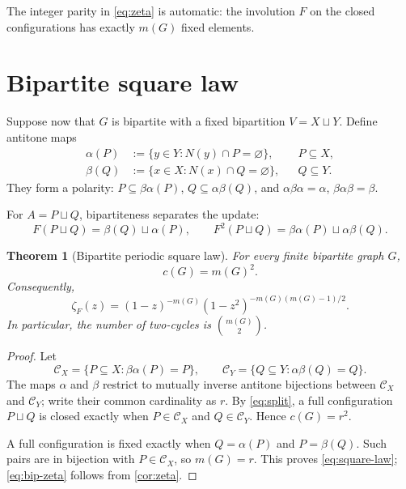 \documentclass[11pt,a4paper]{amsart}
\newtheorem{theorem}{Theorem}[section]
\theoremstyle{definition}
\theoremstyle{remark}
\begin{document}
The integer parity in \eqref{eq:zeta} is automatic: the involution $F$ on
the closed configurations has exactly $m(G)$ fixed elements.

\section{Bipartite square law}

Suppose now that $G$ is bipartite with a fixed bipartition
$V=X\sqcup Y$.  Define antitone maps
\begin{align}
 \alpha(P)&:=\{y\in Y:N(y)\cap P=\varnothing\},&&P\subseteq X,
 \label{eq:alpha}\\
 \beta(Q)&:=\{x\in X:N(x)\cap Q=\varnothing\},&&Q\subseteq Y.
 \label{eq:beta}
\end{align}
They form a polarity: $P\subseteq\beta\alpha(P)$,
$Q\subseteq\alpha\beta(Q)$, and
$\alpha\beta\alpha=\alpha$, $\beta\alpha\beta=\beta$.

For $A=P\sqcup Q$, bipartiteness separates the update:
\begin{equation}\label{eq:split}
 F(P\sqcup Q)=\beta(Q)\sqcup\alpha(P),
 \qquad
 F^2(P\sqcup Q)=\beta\alpha(P)\sqcup\alpha\beta(Q).
\end{equation}

\begin{theorem}[Bipartite periodic square law]\label{thm:square}
For every finite bipartite graph $G$,
\begin{equation}\label{eq:square-law}
 \boxed{c(G)=m(G)^2.}
\end{equation}
Consequently,
\begin{equation}\label{eq:bip-zeta}
 \boxed{\displaystyle
 \zeta_F(z)=(1-z)^{-m(G)}
 (1-z^2)^{-m(G)(m(G)-1)/2}.}
\end{equation}
In particular, the number of two-cycles is $\binom{m(G)}2$.
\end{theorem}

\begin{proof}
Let
\[
 \mathcal C_X=\{P\subseteq X:\beta\alpha(P)=P\},\qquad
 \mathcal C_Y=\{Q\subseteq Y:\alpha\beta(Q)=Q\}.
\]
The maps $\alpha$ and $\beta$ restrict to mutually inverse antitone
bijections between $\mathcal C_X$ and $\mathcal C_Y$; write their common
cardinality as $r$.  By \eqref{eq:split}, a full configuration
$P\sqcup Q$ is closed exactly when $P\in\mathcal C_X$ and
$Q\in\mathcal C_Y$.  Hence $c(G)=r^2$.

A full configuration is fixed exactly when
$Q=\alpha(P)$ and $P=\beta(Q)$.  Such pairs are in bijection with
$P\in\mathcal C_X$, so $m(G)=r$.  This proves \eqref{eq:square-law};
\eqref{eq:bip-zeta} follows from \cref{cor:zeta}.
\end{proof}
\end{document}
